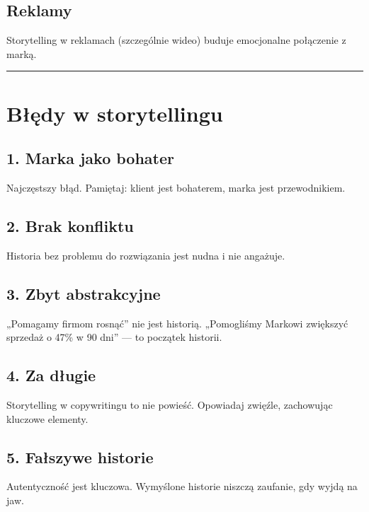 \documentclass[
  12pt,
  a4paper,
  twoside,
  openright,
  12pt,
  DIV=12,
  BCOR=12mm]{scrbook}
\newcommand{\decoline}{%
  \begin{center}
    \textcolor{bordergray}{\rule{0.3\textwidth}{0.5pt}}
  \end{center}
}
\begin{document}
\subsection{Reklamy}\label{reklamy}

Storytelling w reklamach (szczególnie wideo) buduje emocjonalne
połączenie z marką.

\decoline

\section{Błędy w storytellingu}\label{bux142ux119dy-w-storytellingu}

\subsection{1. Marka jako bohater}\label{marka-jako-bohater}

Najczęstszy błąd. Pamiętaj: klient jest bohaterem, marka jest
przewodnikiem.

\subsection{2. Brak konfliktu}\label{brak-konfliktu}

Historia bez problemu do rozwiązania jest nudna i nie angażuje.

\subsection{3. Zbyt abstrakcyjne}\label{zbyt-abstrakcyjne}

„Pomagamy firmom rosnąć'' nie jest historią. „Pomogliśmy Markowi
zwiększyć sprzedaż o 47\% w 90 dni'' --- to początek historii.

\subsection{4. Za długie}\label{za-dux142ugie}

Storytelling w copywritingu to nie powieść. Opowiadaj zwięźle,
zachowując kluczowe elementy.

\subsection{5. Fałszywe historie}\label{faux142szywe-historie}

Autentyczność jest kluczowa. Wymyślone historie niszczą zaufanie, gdy
wyjdą na jaw.
\end{document}
